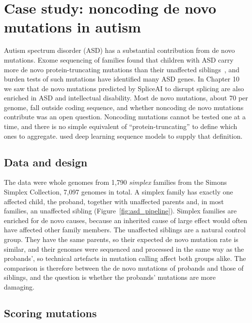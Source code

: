 \section{Case study: noncoding de novo mutations in autism}
\label{sec:autism}

Autism spectrum disorder (ASD) has a substantial contribution from de novo mutations. Exome sequencing of families found that children with ASD carry more de novo protein-truncating mutations than their unaffected siblings~\citep{iossifov2014}, and burden tests of such mutations have identified many ASD genes. In Chapter 10 we saw that de novo mutations predicted by SpliceAI to disrupt splicing are also enriched in ASD and intellectual disability. Most de novo mutations, about 70 per genome, fall outside coding sequence, and whether noncoding de novo mutations contribute was an open question. Noncoding mutations cannot be tested one at a time, and there is no simple equivalent of ``protein-truncating'' to define which ones to aggregate. \citet{zhou2019} used deep learning sequence models to supply that definition.

\subsection{Data and design}

The data were whole genomes from 1,790 \emph{simplex} families from the Simons Simplex Collection, 7,097 genomes in total. A simplex family has exactly one affected child, the proband, together with unaffected parents and, in most families, an unaffected sibling (Figure~\ref{fig:asd_pipeline}). Simplex families are enriched for de novo causes, because an inherited cause of large effect would often have affected other family members. The unaffected siblings are a natural control group. They have the same parents, so their expected de novo mutation rate is similar, and their genomes were sequenced and processed in the same way as the probands', so technical artefacts in mutation calling affect both groups alike. The comparison is therefore between the de novo mutations of probands and those of siblings, and the question is whether the probands' mutations are more damaging.

\subsection{Scoring mutations}

